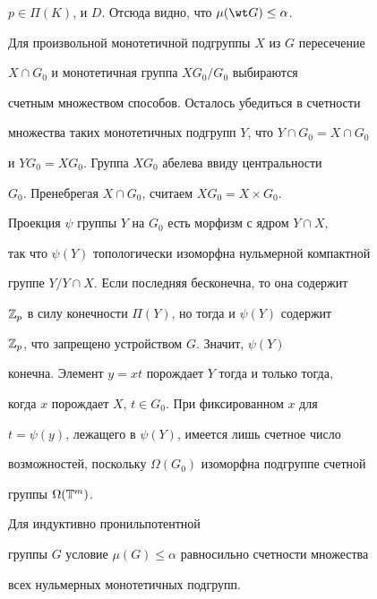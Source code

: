 $p\in\Pi(K)$, и $D$. Отсюда видно, что $\mu(\wt G)\le\alpha$. 


 


Для произвольной монотетичной подгруппы $X$ из $G$ пересечение 


$X\cap G_0$ и монотетичная группа $XG_0/G_0$ выбираются  


счетным множеством способов. Осталось убедиться в счетности  


множества таких монотетичных подгрупп $Y$, что $Y\cap G_0=X\cap G_0$ 


и $YG_0=XG_0$. Группа $XG_0$ абелева ввиду центральности 


$G_0$. Пренебрегая $X\cap G_0$, считаем $XG_0=X\times G_0$. 


Проекция $\psi$ группы $Y$ на $G_0$ есть морфизм с ядром $Y\cap X$, 


так что $\psi(Y)$ топологически изоморфна нульмерной компактной  


группе $Y/Y\cap X$. Если последняя бесконечна, то она содержит  


$\Bbb Z_p$ в силу конечности $\Pi(Y)$, но тогда и $\psi(Y)$ содержит  


$\Bbb Z_p$, что запрещено устройством $G$. Значит, $\psi(Y)$ 


конечна. Элемент $y=xt$ порождает $Y$ тогда и только тогда,  


когда $x$ порождает $X$, $t\in G_0$. При фиксированном $x$ для  


$t=\psi(y)$, лежащего в $\psi(Y)$, имеется лишь счетное число  


возможностей, поскольку $\Omega(G_0)$ изоморфна подгруппе счетной  


группы $\Omega(\Bbb T^m)$. 


 


\begin{cor} 


Для индуктивно пронильпотентной  


группы $G$ условие $\mu(G)\le\alpha$ равносильно счетности множества 


всех нульмерных монотетичных подгрупп. 


\end{cor} 


 


